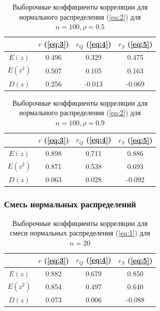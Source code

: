 \documentclass{article}
\begin{document}
\begin{table} [hb]
\begin{center}
\begin{tabular}{|c|c|c|c|}
\hline 
 & $r$ (\ref{eq:3}) & $r_Q$ (\ref{eq:4}) & $r_S$ (\ref{eq:5}) \\ 
\hline 
$E(z)$ & 0.496 & 0.329 & 0.475 \\
\hline 
$E(z^2)$ & 0.507 & 0.105 & 0.163 \\
\hline 
$D(z)$ & 0.256 & -0.013 & -0.069 \\
\hline 
\end{tabular} 
\caption{Выборочные коэффициенты корреляции для нормального распределения (\ref{eq:2}) для $n = 100, \rho = 0.5$}
\end{center}
\end{table}

\begin{table} [hb]
\begin{center}
\begin{tabular}{|c|c|c|c|}
\hline 
 & $r$ (\ref{eq:3}) & $r_Q$ (\ref{eq:4}) & $r_S$ (\ref{eq:5}) \\ 
\hline 
$E(z)$ & 0.898 & 0.711 & 0.886 \\
\hline 
$E(z^2)$ & 0.871 & 0.538 & 0.693 \\
\hline 
$D(z)$ & 0.063 & 0.028 & -0.092 \\
\hline 
\end{tabular} 
\caption{Выборочные коэффициенты корреляции для нормального распределения (\ref{eq:2}) для $n = 100, \rho = 0.9$}
\end{center}
\end{table}

\newpage
\subsubsection{Смесь нормальных распределений} \label{sec:2}

\begin{table} [hb]
\begin{center}
\begin{tabular}{|c|c|c|c|}
\hline 
 & $r$ (\ref{eq:3}) & $r_Q$ (\ref{eq:4}) & $r_S$ (\ref{eq:5}) \\ 
\hline 
$E(z)$ & 0.882 & 0.679 & 0.850 \\
\hline 
$E(z^2)$ & 0.854 & 0.497 & 0.640 \\
\hline 
$D(z)$ & 0.073 & 0.006 & -0.088 \\
\hline 
\end{tabular} 
\caption{Выборочные коэффициенты корреляции для смеси нормальных распределения (\ref{eq:1}) для $n = 20$}
\end{center}
\end{table}
\end{document}
